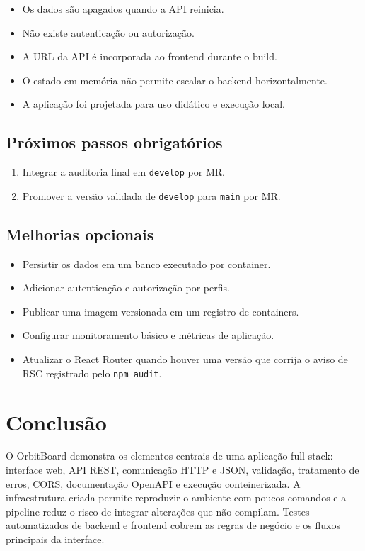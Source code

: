 \documentclass[12pt,a4paper,openany]{report}
\begin{document}
\begin{itemize}
  \item Os dados são apagados quando a API reinicia.
  \item Não existe autenticação ou autorização.
  \item A URL da API é incorporada ao frontend durante o build.
  \item O estado em memória não permite escalar o backend horizontalmente.
  \item A aplicação foi projetada para uso didático e execução local.
\end{itemize}

\section{Próximos passos obrigatórios}

\begin{enumerate}
  \item Integrar a auditoria final em \texttt{develop} por MR.
  \item Promover a versão validada de \texttt{develop} para \texttt{main} por MR.
\end{enumerate}

\section{Melhorias opcionais}

\begin{itemize}
  \item Persistir os dados em um banco executado por container.
  \item Adicionar autenticação e autorização por perfis.
  \item Publicar uma imagem versionada em um registro de containers.
  \item Configurar monitoramento básico e métricas de aplicação.
  \item Atualizar o React Router quando houver uma versão que corrija o aviso de RSC registrado pelo \texttt{npm audit}.
\end{itemize}

\chapter{Conclusão}

O OrbitBoard demonstra os elementos centrais de uma aplicação full stack: interface web, API REST, comunicação HTTP e JSON, validação, tratamento de erros, CORS, documentação OpenAPI e execução conteinerizada. A infraestrutura criada permite reproduzir o ambiente com poucos comandos e a pipeline reduz o risco de integrar alterações que não compilam. Testes automatizados de backend e frontend cobrem as regras de negócio e os fluxos principais da interface.
\end{document}
